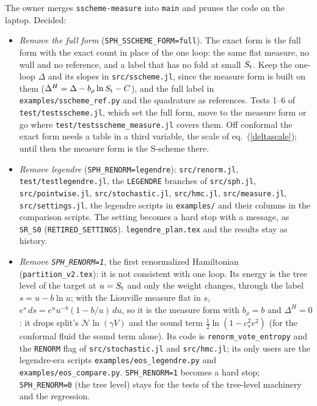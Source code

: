 \documentclass[11pt,aps,preprint,nofootinbib,superscriptaddress,tightenlines]{revtex4-2}
\def\Eq#1{eq.~(\ref{#1})}
\begin{document}
The owner merges \texttt{sscheme-measure} into \texttt{main} and prunes the code on the laptop.  Decided:
\begin{itemize}
\item \emph{Remove the full form} (\texttt{SPH\_SSCHEME\_FORM=full}).  The exact form is the full form with the exact count in place of the one
  loop: the same flat measure, no wall and no reference, and a label that has no fold at small $S_{\rm t}$.  Keep the one-loop $\Delta$ and its
  slopes in \nolinkurl{src/sscheme.jl}, since the measure form is built on them ($\Delta^H=\Delta-b_\rho\ln S_{\rm t}-C$), and the full label in
  \nolinkurl{examples/sscheme_ref.py} and the quadrature as references.  Tests 1--6 of \nolinkurl{test/testsscheme.jl}, which set the full form,
  move to the measure form or go where \nolinkurl{test/testsscheme_measure.jl} covers them.  Off conformal the exact form needs a table in a
  third variable, the scale of \Eq{deltascale}; until then the measure form is the S-scheme there.
\item \emph{Remove legendre} (\texttt{SPH\_RENORM=legendre}): \nolinkurl{src/renorm.jl}, \nolinkurl{test/testlegendre.jl}, the
  \texttt{LEGENDRE} branches of \nolinkurl{src/sph.jl}, \nolinkurl{src/pointwise.jl}, \nolinkurl{src/stochastic.jl}, \nolinkurl{src/hmc.jl},
  \nolinkurl{src/measure.jl}, \nolinkurl{src/settings.jl}, the legendre scripts in \nolinkurl{examples/} and their columns in the comparison
  scripts.  The setting becomes a hard stop with a message, as \texttt{SR\_S0} (\texttt{RETIRED\_SETTINGS}).  \nolinkurl{legendre_plan.tex} and the
  results stay as history.
\end{itemize}
\begin{itemize}
\item \emph{Remove \texttt{SPH\_RENORM=1}}, the first renormalized Hamiltonian (\nolinkurl{partition_v2.tex}): it is not consistent with one loop.
  Its energy is the tree level of the target at $u=S_{\rm t}$ and only the weight changes, through the label $s=u-b\ln u$; with the Liouville
  measure flat in $s$, $e^s\,ds=e^u u^{-b}(1-b/u)\,du$, so it is the measure form with $b_\rho=b$ and $\Delta^H=0$: it drops split's
  $\mathcal N\ln(\gamma V)$ and the sound term $\tfrac12\ln(1-c_s^2v^2)$ (for the conformal fluid the sound term alone).  Its code is
  \texttt{renorm\_vote\_entropy} and the \texttt{RENORM} flag of \nolinkurl{src/stochastic.jl} and \nolinkurl{src/hmc.jl}; its only users are the
  legendre-era scripts \nolinkurl{examples/eos_legendre.py} and \nolinkurl{examples/eos_compare.py}.  \texttt{SPH\_RENORM=1} becomes a hard stop;
  \texttt{SPH\_RENORM=0} (the tree level) stays for the tests of the tree-level machinery and the regression.
\end{itemize}
\end{document}

